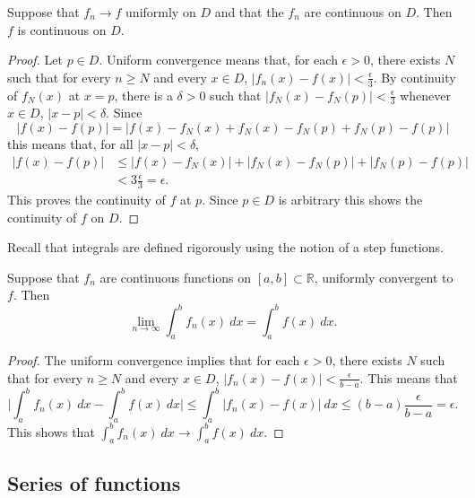 \begin{theorem}
  \label{thm:continuous-limit}
  Suppose that \(f_n \to f\) uniformly on \(D\) and that the \(f_n\) are continuous on \(D\).
  Then \(f\) is continuous on \(D\).
\end{theorem}


\begin{proof}
  Let \(p\in D\).
  Uniform convergence means that, for each \(\epsilon>0\), there exists \(N\) such that for every \(n\geq N\) and every \(x\in D\), \(|f_n(x) - f(x)| < \frac{\epsilon}{3}\).
  By continuity of \(f_N(x)\) at \(x=p\), there is a \(\delta >0\) such that \(|f_N(x)-f_N(p)| < \frac{\epsilon}{3} \) whenever \(x\in D\), \(|x-p| <\delta\).
  Since
  \[
    | f(x) - f(p) | = |f(x) - f_N(x) + f_N(x) - f_N(p) + f_N(p) - f(p) | \]
  this means that, for all \(|x-p| <\delta\),
  \[
    \begin{aligned}
      | f(x) - f(p) | & \leq   |f(x) - f_N(x)| + |f_N(x) - f_N(p)| + |f_N(p) - f(p) | \\
                      & < 3 \frac{\epsilon}{3} = \epsilon.
    \end{aligned}
  \]
  This proves the continuity of \(f\) at \(p\). Since \(p\in D\) is arbitrary this shows the continuity of \(f\) on \(D\).
\end{proof}


Recall that integrals are defined rigorously using the notion of a step functions.

\begin{theorem}
  \label{thm:limit-of-integral}
  Suppose that \(f_n\) are continuous functions on \([a,b] \subset \mathbb{R}\), uniformly convergent to \(f\).
  Then
  \[
    \lim_{n\to \infty} \int_{a}^{b} f_n(x) \ dx = \int_{a}^{b} f(x) \ dx.
  \]
\end{theorem}

\begin{proof}
  The uniform convergence implies that for each \(\epsilon>0\), there exists \(N\) such that for every \(n\geq N\) and every \(x\in D\), \(|f_n(x) - f(x)| <  \frac{\epsilon}{b-a}\).
  This means that
  \[ \Big| \int_{a}^{b} f_n(x) \ dx - \int_{a}^{b} f(x) \ dx \Big|
    \leq \int_{a}^{b} | f_n(x) - f(x) | \ dx
    \leq (b-a) \frac{\epsilon}{b-a} = \epsilon.\]
  This shows that \(\int_{a}^{b} f_n(x) \ dx \to  \int_{a}^{b} f(x) \ dx\).
\end{proof}


\subsection*{Series of functions}



